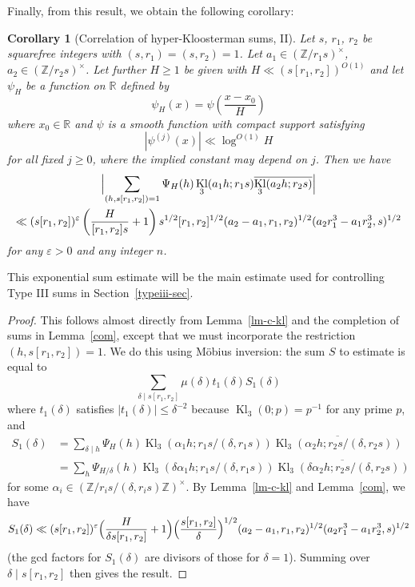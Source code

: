 \documentclass[12pt,a4paper,reqno]{amsart}
\numberwithin{equation}{section}
\DeclareMathOperator{\hypk}{Kl}
\theoremstyle{plain}
\newtheorem{corollary}[theorem]{Corollary}
\theoremstyle{definition}
\newcommand\R{\mathbb{R}}
\newcommand\Z{\mathbb{Z}}
\newcommand\eps{\varepsilon}
\begin{document}
Finally, from this result, we obtain the following corollary:

\begin{corollary}[Correlation of hyper-Kloosterman sums,
  II]\label{corr-2} Let $s$, $r_1$, $r_2$ be squarefree integers with
  $(s,r_1)=(s,r_2)=1$. Let $a_1 \in (\Z/r_1 s)^\times$, $a_2 \in
  (\Z/r_2s)^\times$.  Let further $H \geq 1$ be given with $H\ll
  (s[r_1,r_2])^{O(1)}$ and let $\psi_H$ be a function on $\R$ defined
  by
$$
\psi_H(x) = \psi\left(\frac{x-x_0}{H}\right)
$$
where $x_0\in \R$ and $\psi$ is a smooth function with compact support
satisfying
$$
|\psi^{(j)}(x)| \ll \log^{O(1)} H
$$
for all fixed $j \geq 0$, where the implied constant may depend on
$j$.  Then we have
\begin{multline*}
  \Bigl|
  \sum_{(h,s[r_1,r_2])=1} \Psi_H(h) \hypk_3(a_1 h; r_1 s) \overline{\hypk_3(a_2 h; r_2 s)}\Bigr| \\
  \ll (s[r_1,r_2])^{\eps}\left(\frac{H}{[r_1,r_2]s} + 1\right) s^{1/2}
  [r_1,r_2]^{1/2} (a_2-a_1,r_1,r_2)^{1/2}(a_2 r_1^3 - a_1 r_2^3,s)^{1/2}
\end{multline*}
for any $\eps>0$ and any integer $n$.
\end{corollary}

This exponential sum estimate will be the main estimate used for
controlling Type III sums in Section~\ref{typeiii-sec}.

\begin{proof}
This follows almost directly from Lemma~\ref{lm-c-kl} and the
completion of sums in Lemma~\ref{com}, except that we must incorporate
the restriction $(h,s[r_1,r_2])=1$. We do this using M\"obius
inversion: the sum $S$ to estimate is equal to
$$
\sum_{\delta\mid s[r_1,r_2]}\mu(\delta)t_1(\delta)S_1(\delta)
$$
where $t_1(\delta)$ satisfies $|t_1(\delta)|\leq \delta^{-2}$ because
$\hypk_3(0;p)=p^{-1}$ for any prime $p$, and
\begin{align*}
  S_1(\delta)&=\sum_{\delta\mid h} \Psi_H(h) \hypk_3(\alpha_1 h; r_1
  s/(\delta,r_1s)) \overline{\hypk_3(\alpha_2 h; r_2 s/(\delta,r_2s))}
  \\
  &=\sum_{h} \Psi_{H/\delta}(h) \hypk_3(\delta\alpha_1 h; r_1
  s/(\delta,r_1s)) \overline{\hypk_3(\delta\alpha_2 h; r_2
    s/(\delta,r_2s))}
\end{align*}
for some $\alpha_i\in (\Z/r_is/(\delta,r_is)\Z)^{\times}$. By
Lemma~\ref{lm-c-kl} and Lemma~\ref{com}, we have
$$
S_1(\delta)\ll (s[r_1,r_2])^{\eps}
\Bigl(\frac{H}{\delta s[r_1,r_2]}+1\Bigr)
\Bigl(\frac{s[r_1,r_2]}{\delta}\Bigr)^{1/2}
(a_2-a_1,r_1,r_2)^{1/2}
(a_2r_1^3-a_1r_2^3,s)^{1/2}
$$
(the gcd factors for $S_1(\delta)$ are divisors of those for
$\delta=1$). Summing over $\delta\mid s[r_1,r_2]$ then gives the
result.
\end{proof}
\end{document}
